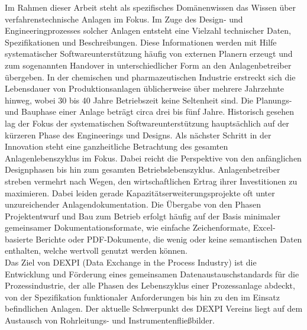 Im Rahmen dieser Arbeit steht als spezifisches Domänenwissen das Wissen über verfahrenstechnische Anlagen im Fokus. Im Zuge des Design- und Engineeringprozesses solcher Anlagen entsteht eine Vielzahl technischer Daten, Spezifikationen und Beschreibungen. Diese Informationen werden mit Hilfe systematischer Softwareunterstützung häufig von externen Planern erzeugt und zum sogenannten Handover in unterschiedlicher Form an den Anlagenbetreiber übergeben. In der chemischen und pharmazeutischen Industrie erstreckt sich die Lebensdauer von Produktionsanlagen üblicherweise über mehrere Jahrzehnte hinweg, wobei 30 bis 40 Jahre Betriebszeit keine Seltenheit sind. Die Planungs- und Bauphase einer Anlage beträgt circa drei bis fünf Jahre. Historisch gesehen lag der Fokus der systematischen Softwareunterstützung hauptsächlich auf der kürzeren Phase des Engineerings und Designs. Als nächster Schritt in der Innovation steht eine ganzheitliche Betrachtung des gesamten Anlagenlebenszyklus im Fokus. Dabei reicht die Perspektive von den anfänglichen Designphasen bis hin zum gesamten Betriebslebenszyklus. Anlagenbetreiber streben vermehrt nach Wegen, den wirtschaftlichen Ertrag ihrer Investitionen zu maximieren. Dabei leiden gerade Kapazitätserweiterungsprojekte oft unter unzureichender Anlagendokumentation. Die Übergabe von den Phasen Projektentwurf und Bau zum Betrieb erfolgt häufig auf der Basis minimaler gemeinsamer Dokumentationsformate, wie einfache Zeichenformate, Excel-basierte Berichte oder PDF-Dokumente, die wenig oder keine semantischen Daten enthalten, welche wertvoll  genutzt werden können. \parencite{wiedau_asset_2018} \\

Das Ziel von DEXPI (Data Exchange in the Process Industry) ist die Entwicklung und Förderung eines gemeinsamen Datenaustauschstandards für die Prozessindustrie, der alle Phasen des Lebenszyklus einer Prozessanlage abdeckt, von der Spezifikation funktionaler Anforderungen bis hin zu den im Einsatz befindlichen Anlagen. Der aktuelle Schwerpunkt des DEXPI Vereins liegt auf dem Austausch von Rohrleitungs- und Instrumentenfließbilder. \parencite{noauthor_dexpi_2023} \\



